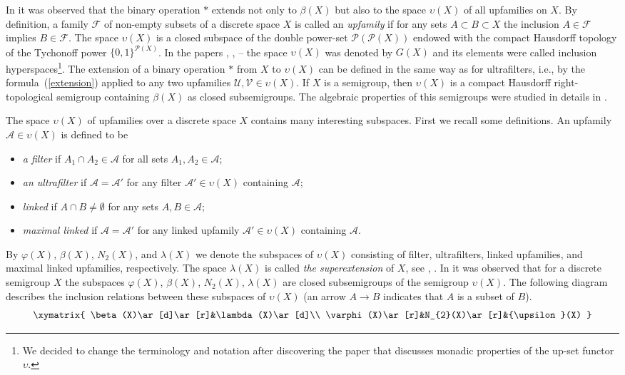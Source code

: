 \documentclass{amsart}
\theoremstyle{definition}
\begin{document}
In \cite{G2} it was observed that the binary operation $*$ extends
not only to $\beta (X)$ but also  to the space $\upsilon(X)$ of all
upfamilies on $X$. By definition, a family ${\mathcal {F}}$ of
non-empty subsets of a discrete space $X$ is called an {\em
upfamily} if for any sets $A\subset B\subset X$ the inclusion $A\in{\mathcal {F}}$ implies $B\in{\mathcal {F}}$. The space ${\upsilon}(X)$ is a closed subspace of the double power-set $\mathcal P(\mathcal P(X))$ endowed with the compact Hausdorff topology of the Tychonoff power $\{0,1\}^{\mathcal P(X)}$. In the papers \cite{G1}, \cite{G2}, \cite{BGN}--\cite{BG4} the space $\upsilon(X)$ was denoted by $G(X)$ and its elements were called inclusion hyperspaces\footnote{We decided to change the terminology and notation after discovering the paper \cite[2.7.4]{SS} that discusses monadic properties of the up-set functor ${\upsilon}$.}. The extension of a binary
operation $\ast$ from $X$ to $\upsilon(X)$ can be defined in the same way
as for ultrafilters, i.e., by the formula~(\ref{extension})
applied to any two upfamilies ${\mathcal U},{\mathcal V}\in \upsilon(X)$. If $X$
is a semigroup, then $\upsilon(X)$ is a compact Hausdorff
right-topological semigroup containing $\beta (X)$ as closed
subsemigroups. The algebraic properties of this semigroups were
studied in details in \cite{G2}.

The space ${\upsilon}(X)$ of upfamilies over a discrete space $X$ contains many
interesting subspaces. First we recall some definitions. An upfamily ${\mathcal A}\in {\upsilon}(X)$ is defined to be
\begin{itemize}
\item {\em a filter} if
$A_1\cap A_2\in{\mathcal A}$ for all sets $A_1,A_2\in{\mathcal A}$;
\item {\em an ultrafilter} if ${\mathcal A}={\mathcal A}'$ for any filter ${\mathcal A}'\in {\upsilon}(X)$ containing ${\mathcal A}$;
\item {\em linked} if $A\cap B\ne\emptyset$ for any sets $A,B\in{\mathcal A}$;
\item {\em maximal linked} if ${\mathcal A}={\mathcal A}'$ for any linked
upfamily ${\mathcal A}'\in {\upsilon}(X)$ containing ${\mathcal A}$.
\end{itemize}

By ${\varphi}(X)$, $\beta(X)$, $N_2(X)$, and $\lambda(X)$  we denote the subspaces of ${\upsilon}(X)$ consisting of filter, ultrafilters, linked upfamilies, and maximal linked upfamilies, respectively. The space $\lambda(X)$ is
called {\em the superextension} of $X$, see \cite{vM}, \cite{Ve}. In \cite{G2} it was
observed that for a discrete semigroup $X$ the subspaces ${\varphi}(X)$, $\beta(X)$, $N_2(X)$, $\lambda(X)$ are closed subsemigroups of
the semigroup ${\upsilon}(X)$.
The following diagram describes the inclusion relations between
these subspaces of ${\upsilon}(X)$ (an arrow $A\to B$ indicates that $A$ is a subset of $B$).
$$
\xymatrix{
\beta(X)\ar[d]\ar[r]&\lambda(X)\ar[d]\\
\varphi(X)\ar[r]&N_{2}(X)\ar[r]&{\upsilon}(X)
}$$
\end{document}
